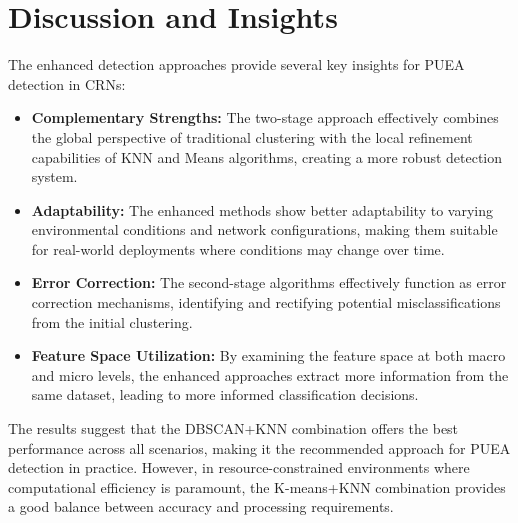 \section{Discussion and Insights}

The enhanced detection approaches provide several key insights for PUEA detection in CRNs:

\begin{itemize}
    \item \textbf{Complementary Strengths:} The two-stage approach effectively combines the global perspective of traditional clustering with the local refinement capabilities of KNN and Means algorithms, creating a more robust detection system.
    
    \item \textbf{Adaptability:} The enhanced methods show better adaptability to varying environmental conditions and network configurations, making them suitable for real-world deployments where conditions may change over time.
    
    \item \textbf{Error Correction:} The second-stage algorithms effectively function as error correction mechanisms, identifying and rectifying potential misclassifications from the initial clustering.
    
    \item \textbf{Feature Space Utilization:} By examining the feature space at both macro and micro levels, the enhanced approaches extract more information from the same dataset, leading to more informed classification decisions.
\end{itemize}

The results suggest that the DBSCAN+KNN combination offers the best performance across all scenarios, making it the recommended approach for PUEA detection in practice. However, in resource-constrained environments where computational efficiency is paramount, the K-means+KNN combination provides a good balance between accuracy and processing requirements.
